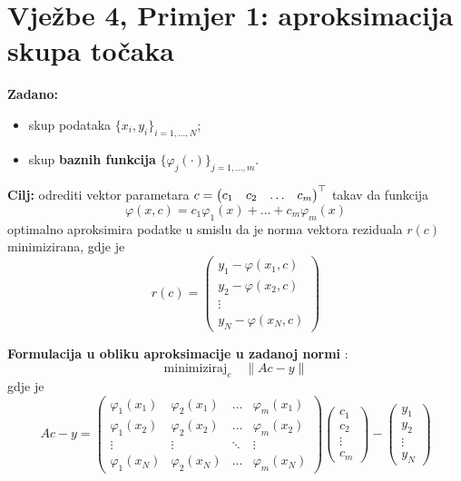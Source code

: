 \section{Vježbe 4, Primjer 1: aproksimacija skupa točaka}
\label{sec:vj4-primjer1}

\begin{zadatak}

\textbf{Zadano:}
\begin{itemize}
  \item skup podataka $\{x_i, y_i\}_{i=1,\dots,N}$;
  \item skup \textbf{baznih funkcija} $\{\varphi_j(\cdot)\}_{j=1,\dots,m}$.
\end{itemize}

\textbf{Cilj:} odrediti vektor parametara
$c = \begin{pmatrix} c_1 & c_2 & \dots & c_m\end{pmatrix}^{\top}$ takav da funkcija
\[
\varphi(x,c) = c_1\varphi_1(x) + \dots + c_m\varphi_m(x)
\]
optimalno aproksimira podatke u smislu da je norma vektora reziduala $r(c)$
minimizirana, gdje je
\[
r(c) = \begin{pmatrix}
y_1 - \varphi(x_1,c) \\
y_2 - \varphi(x_2,c) \\
\vdots \\
y_N - \varphi(x_N,c)
\end{pmatrix}
\]

\medskip
\textbf{Formulacija u obliku aproksimacije u zadanoj normi} :
\[
\text{minimiziraj}_c \quad \|Ac - y\|
\]
gdje je
\[
Ac - y = \begin{pmatrix}
\varphi_1(x_1) & \varphi_2(x_1) & \dots & \varphi_m(x_1) \\
\varphi_1(x_2) & \varphi_2(x_2) & \dots & \varphi_m(x_2) \\
\vdots & \vdots & \ddots & \vdots \\
\varphi_1(x_N) & \varphi_2(x_N) & \dots & \varphi_m(x_N)
\end{pmatrix}
\begin{pmatrix} c_1 \\ c_2 \\ \vdots \\ c_m \end{pmatrix}
- \begin{pmatrix} y_1 \\ y_2 \\ \vdots \\ y_N \end{pmatrix}
\]


\end{zadatak}
